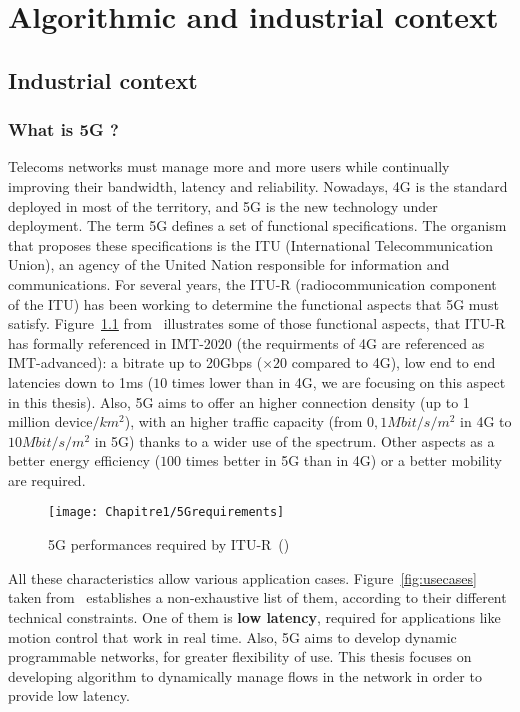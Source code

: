 
\chapter{Algorithmic and industrial context}
\label{chap:context}
\minitoc

\section{Industrial context}
\subsection{What is 5G ?}



Telecoms networks must manage more and more users while continually improving their bandwidth, latency and reliability. Nowadays, 4G is the standard deployed in most of the territory, and 5G is the new technology under deployment. The term 5G defines a set of functional specifications. The organism that proposes these specifications is the ITU (International Telecommunication Union), an agency of the United Nation responsible for information and communications. For several years, the ITU-R (radiocommunication component of the ITU) has been working to determine the functional aspects that 5G must satisfy. Figure~\ref{fig:5gperf} from~\cite{dahlman20185g} illustrates some of those functional aspects, that ITU-R has formally referenced in IMT-2020 (the requirments of 4G are referenced as IMT-advanced): a bitrate up to 20Gbps ($\times 20$ compared to 4G), low end to end latencies down to 1ms ($10$ times lower than in 4G, we are focusing on this aspect in this thesis).
Also, 5G aims to offer an higher connection density (up to 1 million device$/km^2$), with an higher traffic capacity (from $0,1 Mbit/s/m^2$ in 4G to $10 Mbit/s/m^2$ in 5G) thanks to a wider use of the spectrum. Other aspects as a better energy efficiency ($100$ times better in 5G than in 4G) or a better mobility are required. 

  \begin{figure}[h]
      \begin{center}
      \texttt{[image: Chapitre1/5Grequirements]}
      \end{center}
      \caption{5G performances required by ITU-R~(\cite{dahlman20185g})}\label{fig:5gperf}
      \end{figure}

All these characteristics allow various application cases. Figure~\ref{fig:usecases} taken from~\cite{5GACIA} establishes a non-exhaustive list of them, according to their different technical constraints. One of them is \textbf{low latency}, required for applications like motion control that work in real time. Also,  5G aims to develop dynamic programmable networks, for greater flexibility of use. This thesis focuses on developing algorithm to dynamically manage flows in the network in order to provide low latency.

